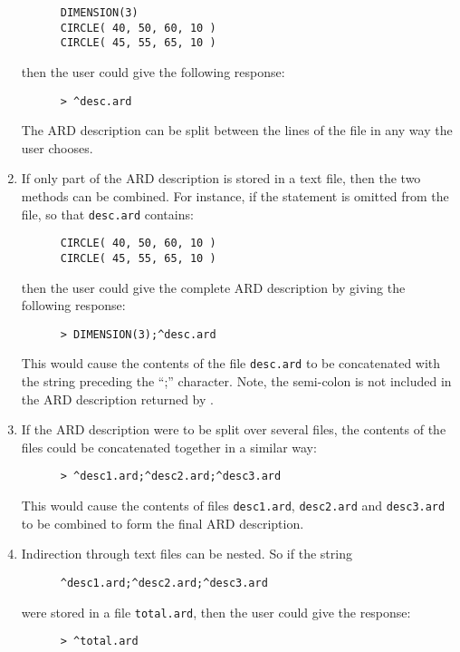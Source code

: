 \begin{enumerate}
\small
\begin{verbatim}
      DIMENSION(3)             
      CIRCLE( 40, 50, 60, 10 ) 
      CIRCLE( 45, 55, 65, 10 ) 
\end{verbatim}
\normalsize

then the user could give the following response:

\small
\begin{verbatim}
      > ^desc.ard
\end{verbatim}
\normalsize

The ARD description can be split between the lines of the file in any way the 
user chooses. 

\item If only part of the ARD description is stored in a text file, then the two
methods can be combined. For instance, if the  statement is omitted 
from the file, so that \verb+desc.ard+ contains: 

\small
\begin{verbatim}
      CIRCLE( 40, 50, 60, 10 ) 
      CIRCLE( 45, 55, 65, 10 ) 
\end{verbatim}
\normalsize

then the user could give the complete ARD description by giving the following 
response:

\small
\begin{verbatim}
      > DIMENSION(3);^desc.ard
\end{verbatim}
\normalsize

This would cause the contents of the file \verb+desc.ard+ to be concatenated with the 
string preceding the ``;'' character. Note, the semi-colon is not included in 
the ARD description returned by .

\item If the ARD description were to be split over several files, the contents 
of the files could be concatenated together in a similar way:

\small
\begin{verbatim}
      > ^desc1.ard;^desc2.ard;^desc3.ard
\end{verbatim}
\normalsize

This would cause the contents of files \verb+desc1.ard+, \verb+desc2.ard+ and 
\verb+desc3.ard+ to be 
combined to form the final ARD description.

\item Indirection through text files can be nested. So if the string

\small
\begin{verbatim}
      ^desc1.ard;^desc2.ard;^desc3.ard
\end{verbatim}
\normalsize

were stored in a file \verb+total.ard+, then the user could give the response: 

\small
\begin{verbatim}
      > ^total.ard
\end{verbatim}
\normalsize

\end{enumerate}

